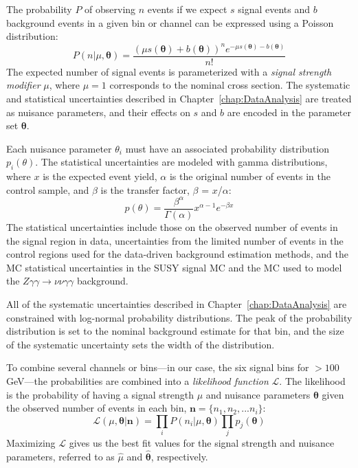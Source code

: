 The probability $P$ of observing $n$ events if we expect $s$ signal events and $b$ background events
in a given bin or channel
can be expressed using a Poisson distribution:
\begin{equation}
P(n|\mu, \bm{\theta}) = \frac{(\mu s(\bm{\theta})+b(\bm{\theta}))^ne^{-\mu s(\bm{\theta})-b(\bm{\theta})}}{n!}
\end{equation}
The expected number of signal events is parameterized with a \textit{signal strength modifier} $\mu$, where $\mu = 1$ 
corresponds to the  nominal cross section. The systematic and statistical uncertainties described in 
Chapter~\ref{chap:DataAnalysis} are treated as nuisance parameters,
and their effects on $s$ and $b$ are encoded in the parameter set $\bm{\theta}$.

Each nuisance parameter $\theta_i$ must have an associated probability distribution $p_i(\theta)$.
The statistical uncertainties are modeled with gamma distributions, where $x$ is the expected event yield, 
$\alpha$ is the original number of events in the control sample, 
and $\beta$ is the transfer factor, $\beta$ = $x$/$\alpha$: 
\begin{equation}
p(\theta) =	\dfrac{\beta^\alpha}{\Gamma(\alpha)} x^{\alpha-1}e^{-\beta x}
\end{equation}
The statistical uncertainties include those on the 
observed number of events in the signal region in data, uncertainties from the limited number of events
in the control regions used for the data-driven background estimation methods, and the MC statistical uncertainties 
in the SUSY signal MC and the MC used to model the $Z\gamma\gamma\rightarrow\nu\nu\gamma\gamma$ 
background.

All of the systematic uncertainties described in Chapter~\ref{chap:DataAnalysis} are constrained
with log-normal probability distributions. The peak of the probability distribution 
is set to the nominal background estimate for that bin, and the size of the systematic uncertainty 
sets the width of the distribution. 

To combine several channels or bins---in our case, the six signal bins for \ETmiss $> 100$ GeV---the 
probabilities are combined into a \textit{likelihood function} $\mathcal{L}$. The likelihood is
the probability of having a signal strength $\mu$ and nuisance parameters $\bm{\theta}$ given the observed
number of events in each bin, $\bm{n} = \{n_1,n_2,...n_i\}$:
 \begin{equation}
 \mathcal{L}(\mu, \bm{\theta}|\bm{n}) = \prod_i P(n_i|\mu,\bm{\theta})  \prod_jp_j(\bm{\theta})
 \label{equ:likelihood}
 \end{equation}
Maximizing $\mathcal{L}$ gives us the best fit values for the signal strength and nuisance parameters, referred to
as $\hat{\mu}$ and $\bm{\hat{\theta}}$, respectively.

